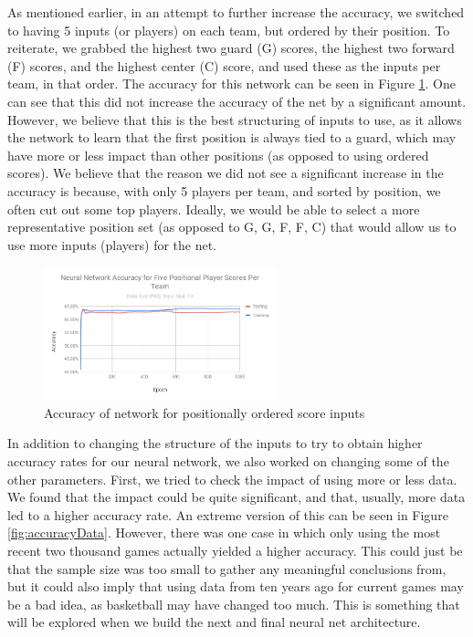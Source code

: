 As mentioned earlier, in an attempt to further increase the accuracy, we switched to having 5 inputs (or players) on each team, but ordered by their position. To reiterate, we grabbed the highest two guard (G) scores, the highest two forward (F) scores, and the highest center (C) score, and used these as the inputs per team, in that order. The accuracy for this network can be seen in Figure \ref{fig:accuracyPositions}. One can see that this did not increase the accuracy of the net by a significant amount. However, we believe that this is the best structuring of inputs to use, as it allows the network to learn that the first position is always tied to a guard, which may have more or less impact than other positions (as opposed to using ordered scores). We believe that the reason we did not see a significant increase in the accuracy is because, with only 5 players per team, and sorted by position, we often cut out some top players. Ideally, we would be able to select a more representative position set (as opposed to G, G, F, F, C) that would allow us to use more inputs (players) for the net.

\begin{figure}[ht]
    \centering
    \includegraphics[width=0.6\textwidth, frame]{figures/accuracyPositions}
    \caption{Accuracy of network for positionally ordered score inputs}
    \label{fig:accuracyPositions}
\end{figure}

In addition to changing the structure of the inputs to try to obtain higher accuracy rates for our neural network, we also worked on changing some of the other parameters. First, we tried to check the impact of using more or less data. We found that the impact could be quite significant, and that, usually, more data led to a higher accuracy rate. An extreme version of this can be seen in Figure \ref{fig:accuracyData}. However, there was one case in which only using the most recent two thousand games actually yielded a higher accuracy. This could just be that the sample size was too small to gather any meaningful conclusions from, but it could also imply that using data from ten years ago for current games may be a bad idea, as basketball may have changed too much. This is something that will be explored when we build the next and final neural net architecture.

